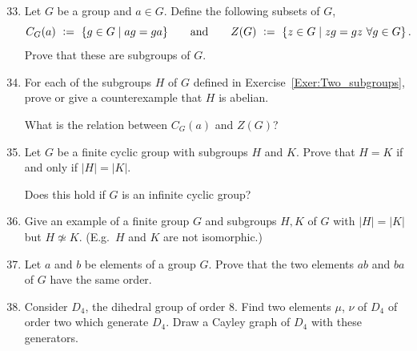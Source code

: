 \documentclass[12pt]{article}
\def\Color#1#2{\special{color push cmyk #1}#2\special{color pop}}
\def\TAMU#1{\Color{.15 1. .39 .49}{#1}}
\def\defcolor#1{\TAMU{#1}}
\begin{document}
\begin{enumerate}
\setcounter{enumi}{32}

\item  \label{Exer:Two_subgroups}
  Let $G$ be a group and $a\in G$.
  Define the following subsets of $G$,
  \[
  \defcolor{C_G(a)}\ \vcentcolon=\ \{ g\in G\mid ag=ga\}
  \qquad\mbox{and}\qquad
  \defcolor{Z(G)}\ \vcentcolon=\ \{ z\in G\mid zg=gz\ \forall g\in G\}\,.
  \]
  Prove that these are subgroups of $G$.

\item
  For each of the subgroups $H$ of $G$ defined in Exercise~\ref{Exer:Two_subgroups}, prove or give a counterexample
  that $H$ is abelian.

  What is the relation between $C_G(a)$ and $Z(G)$?

\item
  Let $G$ be a finite cyclic group with subgroups $H$ and $K$.
  Prove that $H=K$ if and only if $|H|=|K|$.

  Does this hold if $G$ is an infinite cyclic group?


\item
  Give an example of a finite group $G$ and subgroups $H,K$ of $G$ with $|H|=|K|$ but $H\not\simeq K$.
  (E.g.~$H$ and $K$ are not isomorphic.)

\item
  Let $a$ and $b$ be elements of a group $G$.
  Prove that the two elements $ab$ and $ba$ of $G$ have the same order.

\item
  Consider $D_4$, the dihedral group of order 8.
  Find two elements $\mu$, $\nu$ of $D_4$ of order two which generate $D_4$.
  Draw a Cayley graph of $D_4$ with these generators.


\end{enumerate}
\end{document}
